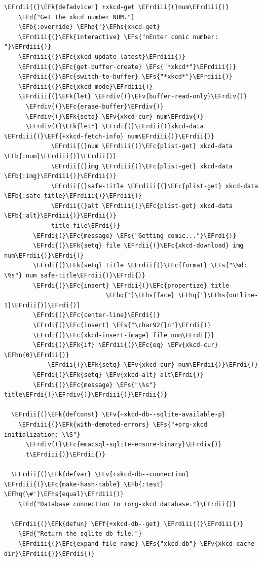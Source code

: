 \documentclass{scrartcl}
\newcommand{\EFk}[1]{\textcolor{EFk}{#1}} %
\newcommand{\EFd}[1]{\textcolor{EFd}{\textit{#1}}} %
\newcommand{\EFs}[1]{\textcolor{EFs}{#1}} %
\newcommand{\EFb}[1]{\textcolor{EFb}{#1}} %
\newcommand{\EFc}[1]{\textcolor{EFc}{#1}} %
\newcommand{\EFv}[1]{\textcolor{EFv}{#1}} %
\newcommand{\EFf}[1]{\textcolor{EFf}{#1}} %
\newcommand{\EFhn}[1]{\textcolor{EFhn}{\textbf{#1}}} %
\newcommand{\EFhq}[1]{\textcolor{EFhq}{#1}} %
\newcommand{\EFhs}[1]{\textcolor{EFhs}{#1}} %
\newcommand{\EFrdi}[1]{\textcolor{EFrdi}{#1}} %
\newcommand{\EFrdii}[1]{\textcolor{EFrdii}{#1}} %
\newcommand{\EFrdiii}[1]{\textcolor{EFrdiii}{#1}} %
\newcommand{\EFrdiv}[1]{\textcolor{EFrdiv}{#1}} %
\begin{document}
\begin{Code}
\begin{Verbatim}[]
  \EFrdii{(}\EFk{defadvice!} +xkcd-get \EFrdiii{(}num\EFrdiii{)}
    \EFd{"Get the xkcd number NUM."}
    \EFb{:override} \EFhq{'}\EFhs{xkcd-get}
    \EFrdiii{(}\EFk{interactive} \EFs{"nEnter comic number: "}\EFrdiii{)}
    \EFrdiii{(}\EFc{xkcd-update-latest}\EFrdiii{)}
    \EFrdiii{(}\EFc{get-buffer-create} \EFs{"*xkcd*"}\EFrdiii{)}
    \EFrdiii{(}\EFc{switch-to-buffer} \EFs{"*xkcd*"}\EFrdiii{)}
    \EFrdiii{(}\EFc{xkcd-mode}\EFrdiii{)}
    \EFrdiii{(}\EFk{let} \EFrdiv{(}\EFv{buffer-read-only}\EFrdiv{)}
      \EFrdiv{(}\EFc{erase-buffer}\EFrdiv{)}
      \EFrdiv{(}\EFk{setq} \EFv{xkcd-cur} num\EFrdiv{)}
      \EFrdiv{(}\EFk{let*} \EFrdi{(}\EFrdii{(}xkcd-data \EFrdiii{(}\EFf{+xkcd-fetch-info} num\EFrdiii{)}\EFrdii{)}
             \EFrdii{(}num \EFrdiii{(}\EFc{plist-get} xkcd-data \EFb{:num}\EFrdiii{)}\EFrdii{)}
             \EFrdii{(}img \EFrdiii{(}\EFc{plist-get} xkcd-data \EFb{:img}\EFrdiii{)}\EFrdii{)}
             \EFrdii{(}safe-title \EFrdiii{(}\EFc{plist-get} xkcd-data \EFb{:safe-title}\EFrdiii{)}\EFrdii{)}
             \EFrdii{(}alt \EFrdiii{(}\EFc{plist-get} xkcd-data \EFb{:alt}\EFrdiii{)}\EFrdii{)}
             title file\EFrdi{)}
        \EFrdi{(}\EFc{message} \EFs{"Getting comic..."}\EFrdi{)}
        \EFrdi{(}\EFk{setq} file \EFrdii{(}\EFc{xkcd-download} img num\EFrdii{)}\EFrdi{)}
        \EFrdi{(}\EFk{setq} title \EFrdii{(}\EFc{format} \EFs{"\%d: \%s"} num safe-title\EFrdii{)}\EFrdi{)}
        \EFrdi{(}\EFc{insert} \EFrdii{(}\EFc{propertize} title
                            \EFhq{'}\EFhs{face} \EFhq{'}\EFhs{outline-1}\EFrdii{)}\EFrdi{)}
        \EFrdi{(}\EFc{center-line}\EFrdi{)}
        \EFrdi{(}\EFc{insert} \EFs{"\char92{}n"}\EFrdi{)}
        \EFrdi{(}\EFc{xkcd-insert-image} file num\EFrdi{)}
        \EFrdi{(}\EFk{if} \EFrdii{(}\EFc{eq} \EFv{xkcd-cur} \EFhn{0}\EFrdii{)}
            \EFrdii{(}\EFk{setq} \EFv{xkcd-cur} num\EFrdii{)}\EFrdi{)}
        \EFrdi{(}\EFk{setq} \EFv{xkcd-alt} alt\EFrdi{)}
        \EFrdi{(}\EFc{message} \EFs{"\%s"} title\EFrdi{)}\EFrdiv{)}\EFrdiii{)}\EFrdii{)}

  \EFrdii{(}\EFk{defconst} \EFv{+xkcd-db--sqlite-available-p}
    \EFrdiii{(}\EFk{with-demoted-errors} \EFs{"+org-xkcd initialization: \%S"}
      \EFrdiv{(}\EFc{emacsql-sqlite-ensure-binary}\EFrdiv{)}
      t\EFrdiii{)}\EFrdii{)}

  \EFrdii{(}\EFk{defvar} \EFv{+xkcd-db--connection} \EFrdiii{(}\EFc{make-hash-table} \EFb{:test} \EFhq{\#'}\EFhs{equal}\EFrdiii{)}
    \EFd{"Database connection to +org-xkcd database."}\EFrdii{)}

  \EFrdii{(}\EFk{defun} \EFf{+xkcd-db--get} \EFrdiii{(}\EFrdiii{)}
    \EFd{"Return the sqlite db file."}
    \EFrdiii{(}\EFc{expand-file-name} \EFs{"xkcd.db"} \EFv{xkcd-cache-dir}\EFrdiii{)}\EFrdii{)}


\end{Verbatim}
\end{Code}
\end{document}
